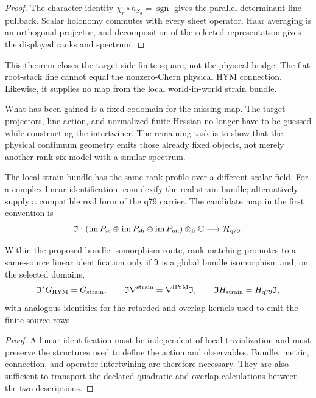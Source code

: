 \documentclass[11pt]{article}
\begin{document}
\begin{proof}
The character identity $\chi_r\circ h_{S_3}=\operatorname{sgn}$ gives the
parallel determinant-line pullback. Scalar holonomy commutes with every sheet
operator. Haar averaging is an orthogonal projector, and decomposition of the
selected representation gives the displayed ranks and spectrum.
\end{proof}

This theorem closes the target-side finite square, not the physical bridge.
The flat root-stack line cannot equal the nonzero-Chern physical HYM
connection. Likewise, it supplies no map from the local world-in-world strain
bundle.

What has been gained is a fixed codomain for the missing map.  The target
projectors, line action, and normalized finite Hessian no longer have to be
guessed while constructing the intertwiner.  The remaining task is to show
that the physical continuum geometry emits those already fixed objects, not
merely another rank-six model with a similar spectrum.

The local strain bundle has the same rank profile over a different scalar
field. For a complex-linear identification, complexify the real strain
bundle; alternatively supply a compatible real form of the q79 carrier.
The candidate map in the first convention is
\[
 \mathfrak I:
 (\operatorname{im}P_{\rm sc}\oplus
 \operatorname{im}P_{\rm sh}\oplus
 \operatorname{im}P_{\rm nil})\otimes_{\mathbb R}\mathbb C
 \longrightarrow \mathcal H_{\rm q79}.
\]

\begin{theorem}
Within the proposed bundle-isomorphism route, rank matching promotes to a
same-source linear identification only if
$\mathfrak I$ is a global bundle isomorphism and, on the selected domains,
\[
 \mathfrak I^*G_{\rm HYM}=G_{\rm strain},
 \qquad
 \mathfrak I\nabla^{\rm strain}=\nabla^{\rm HYM}\mathfrak I,
 \qquad
 \mathfrak I H_{\rm strain}=H_{\rm q79}\mathfrak I,
\]
with analogous identities for the retarded and overlap kernels used to emit
the finite source rows.
\end{theorem}

\begin{proof}
A linear identification must be independent of local trivialization and
must preserve the structures used to define the action and observables.
Bundle, metric, connection, and operator intertwining are therefore necessary.
They are also sufficient to transport the declared quadratic and overlap
calculations between the two descriptions.
\end{proof}
\end{document}
